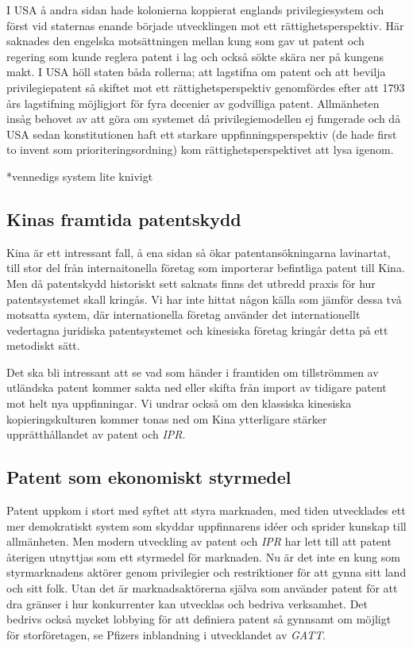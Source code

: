 I USA å andra sidan hade kolonierna koppierat englands privilegiesystem och först vid staternas enande började utvecklingen mot ett rättighetsperspektiv. Här saknades den engelska motsättningen mellan kung som gav ut patent och regering som kunde reglera patent i lag och också sökte skära ner på kungens makt. I USA höll staten båda rollerna; att lagstifna om patent och att bevilja privilegiepatent så skiftet mot ett rättighetsperspektiv genomfördes efter att 1793 års lagstifning möjligjort för fyra decenier av godvilliga patent. Allmänheten insåg behovet av att göra om systemet då privilegiemodellen ej fungerade och då USA sedan konstitutionen haft ett starkare uppfinningsperspektiv (de hade first to invent som prioriteringsordning) kom rättighetsperspektivet att lysa igenom.


*vennedigs system lite knivigt

\subsection{Kinas framtida patentskydd}

Kina är ett intressant fall, å ena sidan så ökar patentansökningarna lavinartat, till stor del från internaitonella företag som importerar befintliga patent till Kina. Men då patentskydd historiskt sett saknats finns det  utbredd praxis för hur patentsystemet skall kringås. Vi har inte hittat någon källa som jämför dessa två motsatta system, där internationella företag använder det internationellt vedertagna juridiska patentsystemet och kinesiska företag kringår detta på ett metodiskt sätt. 

Det ska bli intressant att se vad som händer i framtiden om tillströmmen av utländska patent kommer sakta ned eller skifta från import av tidigare patent mot helt nya uppfinningar. Vi undrar också om den klassiska kinesiska kopieringskulturen kommer tonas ned om Kina ytterligare stärker upprätthållandet av patent och \emph{IPR}.

\subsection{Patent som ekonomiskt styrmedel}
Patent uppkom i stort med syftet att styra marknaden, med tiden utvecklades ett mer demokratiskt system som skyddar uppfinnarens idéer och sprider kunskap till allmänheten. Men modern utveckling  av patent och \emph{IPR} har lett till att patent återigen utnyttjas som ett styrmedel för marknaden. Nu är det inte en kung som styrmarknadens aktörer genom privilegier och restriktioner för att gynna sitt land och sitt folk. Utan det är marknadsaktörerna själva som använder patent för att dra gränser i hur konkurrenter kan utvecklas och bedriva verksamhet. Det bedrivs också mycket lobbying för att definiera patent så gynnsamt om möjligt för storföretagen, se Pfizers inblandning i utvecklandet av \emph{GATT}.

